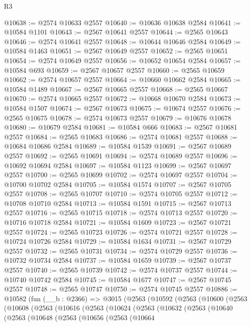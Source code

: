 \begin{lexlean}{R3}
\begin{coremodule}
@10638 := @2574 @10633 @2557
@10640 := @10636 @10638 @2584
@10641 := @10584 @1101
@10643 := @2567 @10641 @2557
@10644 := @2565 @10643
@10646 := @2574 @10641 @2557
@10648 := @10644 @10646 @2584
@10649 := @10584 @1463
@10651 := @2567 @10649 @2557
@10652 := @2565 @10651
@10654 := @2574 @10649 @2557
@10656 := @10652 @10654 @2584
@10657 := @10584 @693
@10659 := @2567 @10657 @2557
@10660 := @2565 @10659
@10662 := @2574 @10657 @2557
@10664 := @10660 @10662 @2584
@10665 := @10584 @1489
@10667 := @2567 @10665 @2557
@10668 := @2565 @10667
@10670 := @2574 @10665 @2557
@10672 := @10668 @10670 @2584
@10673 := @10584 @1507
@10674 := @2567 @10673
@10675 := @10674 @2557
@10676 := @2565 @10675
@10678 := @2574 @10673 @2557
@10679 := @10676 @10678
@10680 := @10679 @2584
@10681 := @10584 @666
@10683 := @2567 @10681 @2557
@10684 := @2565 @10683
@10686 := @2574 @10681 @2557
@10688 := @10684 @10686 @2584
@10689 := @10584 @1539
@10691 := @2567 @10689 @2557
@10692 := @2565 @10691
@10694 := @2574 @10689 @2557
@10696 := @10692 @10694 @2584
@10697 := @10584 @1123
@10699 := @2567 @10697 @2557
@10700 := @2565 @10699
@10702 := @2574 @10697 @2557
@10704 := @10700 @10702 @2584
@10705 := @10584 @1574
@10707 := @2567 @10705 @2557
@10708 := @2565 @10707
@10710 := @2574 @10705 @2557
@10712 := @10708 @10710 @2584
@10713 := @10584 @1591
@10715 := @2567 @10713 @2557
@10716 := @2565 @10715
@10718 := @2574 @10713 @2557
@10720 := @10716 @10718 @2584
@10721 := @10584 @1609
@10723 := @2567 @10721 @2557
@10724 := @2565 @10723
@10726 := @2574 @10721 @2557
@10728 := @10724 @10726 @2584
@10729 := @10584 @1634
@10731 := @2567 @10729 @2557
@10732 := @2565 @10731
@10734 := @2574 @10729 @2557
@10736 := @10732 @10734 @2584
@10737 := @10584 @1659
@10739 := @2567 @10737 @2557
@10740 := @2565 @10739
@10742 := @2574 @10737 @2557
@10744 := @10740 @10742 @2584
@10745 := @10584 @1677
@10747 := @2567 @10745 @2557
@10748 := @2565 @10747
@10750 := @2574 @10745 @2557
@10886 := @10582
    (fun (__b : @2366) =>
    @3015
      (@2563
        (@10592
          (@2563
            (@10600
              (@2563
                (@10608
                  (@2563
                    (@10616
                      (@2563
                        (@10624
                          (@2563
                            (@10632
                              (@2563
                                (@10640
                                  (@2563
                                    (@10648
                                      (@2563
                                        (@10656
                                          (@2563
                                            (@10664

\end{coremodule}
\end{lexlean}
